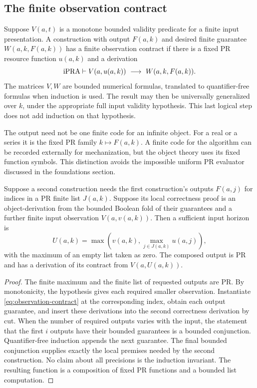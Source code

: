 \subsection{The finite observation contract}

Suppose \(V(a,t)\) is a monotone bounded validity predicate for a finite
input presentation.  A construction with output \(F(a,k)\) and desired
finite guarantee \(W(a,k,F(a,k))\) has a finite observation contract if
there is a fixed PR resource function \(u(a,k)\) and a derivation
\begin{equation}\label{eq:observation-contract}
 \mathrm{iPRA}\vdash
 V(a,u(a,k))\ \longrightarrow\ W(a,k,F(a,k)).
\end{equation}
The matrices \(V,W\) are bounded numerical formulas, translated to
quantifier-free formulas when induction is used.  The result may then be
universally generalized over \(k\), under the appropriate full input
validity hypothesis.  This last logical step does not add induction on
that hypothesis.

The output need not be one finite code for an infinite object.  For a real
or a series it is the fixed PR family \(k\mapsto F(a,k)\).  A finite code
for the algorithm can be recorded externally for mechanization, but the
object theory uses its fixed function symbols.  This distinction avoids
the impossible uniform PR evaluator discussed in the foundations section.

\begin{theorem}
\label{thm:observation-composition}
Suppose a second construction needs the first construction's outputs
\(F(a,j)\) for indices in a PR finite list \(J(a,k)\).  Suppose its local
correctness proof is an object-\ipra derivation from the bounded Boolean
fold of their guarantees and a further finite input
observation \(V(a,v(a,k))\).  Then a sufficient input horizon is
\[
 U(a,k)=\max\left(v(a,k),\max_{j\in J(a,k)}u(a,j)\right),
\]
with the maximum of an empty list taken as zero.  The composed output is
PR and has a derivation of its contract from \(V(a,U(a,k))\).
\end{theorem}

\begin{proof}
The finite maximum and the finite list of requested outputs are PR.
By monotonicity, the hypothesis gives each required smaller observation.
Instantiate \eqref{eq:observation-contract} at the corresponding index,
obtain each output guarantee, and insert these derivations into the
second correctness derivation by cut.  When the number of required
outputs varies with the input, the statement that the first \(i\)
outputs have their bounded guarantees is a bounded conjunction.
Quantifier-free induction appends the next guarantee.  The final
bounded conjunction supplies exactly the local premises needed by the
second construction.  No claim about all precisions is the induction
invariant.  The resulting function is a composition of fixed PR functions
and a bounded list computation.
\end{proof}

